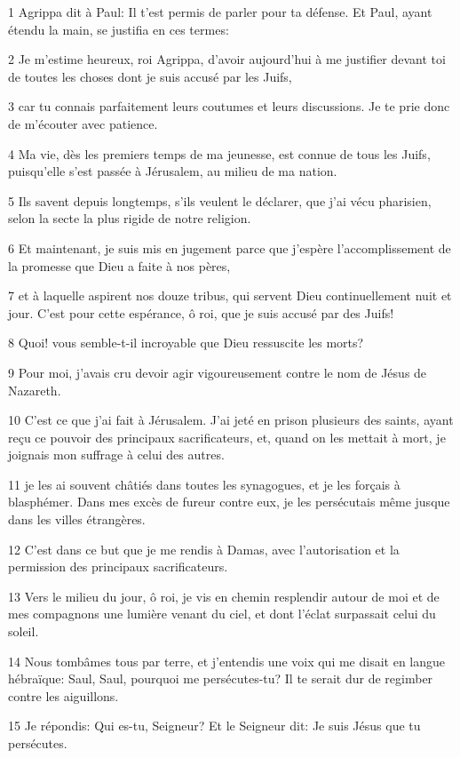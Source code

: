 \par 1 Agrippa dit à Paul: Il t'est permis de parler pour ta défense. Et Paul, ayant étendu la main, se justifia en ces termes:
\par 2 Je m'estime heureux, roi Agrippa, d'avoir aujourd'hui à me justifier devant toi de toutes les choses dont je suis accusé par les Juifs,
\par 3 car tu connais parfaitement leurs coutumes et leurs discussions. Je te prie donc de m'écouter avec patience.
\par 4 Ma vie, dès les premiers temps de ma jeunesse, est connue de tous les Juifs, puisqu'elle s'est passée à Jérusalem, au milieu de ma nation.
\par 5 Ils savent depuis longtemps, s'ils veulent le déclarer, que j'ai vécu pharisien, selon la secte la plus rigide de notre religion.
\par 6 Et maintenant, je suis mis en jugement parce que j'espère l'accomplissement de la promesse que Dieu a faite à nos pères,
\par 7 et à laquelle aspirent nos douze tribus, qui servent Dieu continuellement nuit et jour. C'est pour cette espérance, ô roi, que je suis accusé par des Juifs!
\par 8 Quoi! vous semble-t-il incroyable que Dieu ressuscite les morts?
\par 9 Pour moi, j'avais cru devoir agir vigoureusement contre le nom de Jésus de Nazareth.
\par 10 C'est ce que j'ai fait à Jérusalem. J'ai jeté en prison plusieurs des saints, ayant reçu ce pouvoir des principaux sacrificateurs, et, quand on les mettait à mort, je joignais mon suffrage à celui des autres.
\par 11 je les ai souvent châtiés dans toutes les synagogues, et je les forçais à blasphémer. Dans mes excès de fureur contre eux, je les persécutais même jusque dans les villes étrangères.
\par 12 C'est dans ce but que je me rendis à Damas, avec l'autorisation et la permission des principaux sacrificateurs.
\par 13 Vers le milieu du jour, ô roi, je vis en chemin resplendir autour de moi et de mes compagnons une lumière venant du ciel, et dont l'éclat surpassait celui du soleil.
\par 14 Nous tombâmes tous par terre, et j'entendis une voix qui me disait en langue hébraïque: Saul, Saul, pourquoi me persécutes-tu? Il te serait dur de regimber contre les aiguillons.
\par 15 Je répondis: Qui es-tu, Seigneur? Et le Seigneur dit: Je suis Jésus que tu persécutes.
